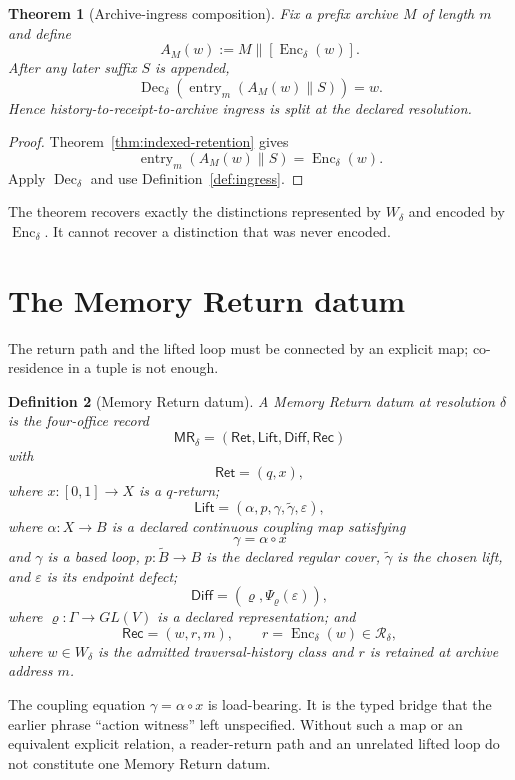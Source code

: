 \documentclass[11pt]{article}
\newtheorem{theorem}{Theorem}[section]
\newtheorem{definition}[theorem]{Definition}
\newcommand{\MR}{\mathsf{MR}}
\newcommand{\Ret}{\mathsf{Ret}}
\newcommand{\Lift}{\mathsf{Lift}}
\newcommand{\Diff}{\mathsf{Diff}}
\newcommand{\Rec}{\mathsf{Rec}}
\begin{document}
\begin{theorem}[Archive-ingress composition]\label{thm:archive-ingress}
Fix a prefix archive $M$ of length $m$ and define
\[
A_M(w):=M\mathbin{\|}[\operatorname{Enc}_\delta(w)].
\]
After any later suffix $S$ is appended,
\[
\operatorname{Dec}_\delta\!\left(
\operatorname{entry}_m(A_M(w)\mathbin{\|}S)
\right)=w.
\]
Hence history-to-receipt-to-archive ingress is split at the declared resolution.
\end{theorem}
\begin{proof}
Theorem~\ref{thm:indexed-retention} gives
\[
\operatorname{entry}_m(A_M(w)\mathbin{\|}S)=\operatorname{Enc}_\delta(w).
\]
Apply $\operatorname{Dec}_\delta$ and use Definition~\ref{def:ingress}.
\end{proof}
The theorem recovers exactly the distinctions represented by $W_\delta$ and encoded by $\operatorname{Enc}_\delta$. It cannot recover a distinction that was never encoded.

\section{The Memory Return datum}
The return path and the lifted loop must be connected by an explicit map; co-residence in a tuple is not enough.

\begin{definition}[Memory Return datum]\label{def:MR}
A Memory Return datum at resolution $\delta$ is the four-office record
\[
\boxed{
\MR_\delta=(\Ret,\Lift,\Diff,\Rec)
}
\]
with
\[
\Ret=(q,x),
\]
where $x:[0,1]\to X$ is a $q$-return;
\[
\Lift=(\alpha,p,\gamma,\widetilde\gamma,\varepsilon),
\]
where $\alpha:X\to B$ is a declared continuous coupling map satisfying
\[
\boxed{\gamma=\alpha\circ x}
\]
and $\gamma$ is a based loop, $p:\widetilde B\to B$ is the declared regular cover, $\widetilde\gamma$ is the chosen lift, and $\varepsilon$ is its endpoint defect;
\[
\Diff=(\varrho,\Psi_{\varrho}(\varepsilon)),
\]
where $\varrho:\Gamma\to GL(V)$ is a declared representation; and
\[
\Rec=(w,r,m),
\qquad
r=\operatorname{Enc}_\delta(w)\in\mathcal R_\delta,
\]
where $w\in W_\delta$ is the admitted traversal-history class and $r$ is retained at archive address $m$.
\end{definition}

The coupling equation $\gamma=\alpha\circ x$ is load-bearing. It is the typed bridge that the earlier phrase ``action witness'' left unspecified. Without such a map or an equivalent explicit relation, a reader-return path and an unrelated lifted loop do not constitute one Memory Return datum.
\end{document}
